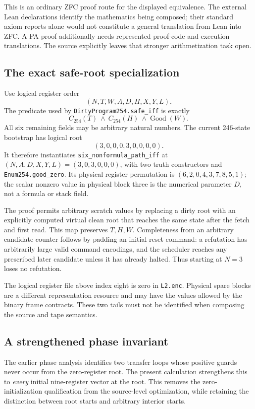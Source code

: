 This is an ordinary ZFC proof route for the displayed equivalence.  The
external Lean declarations identify the mathematics being composed; their
standard axiom reports alone would not constitute a general translation
from Lean into ZFC.  A PA proof additionally needs represented proof-code
and execution translations.  The source explicitly leaves that stronger
arithmetization task open.

\subsection{The exact safe-root specialization}

Use logical register order
\[
 (N,T,W,A,D,H,X,Y,L).
\]
The predicate used by \texttt{DirtyProgram254.safe\_iff} is exactly
\[
 C_{254}(T)\ \wedge\ C_{254}(H)\ \wedge\operatorname{Good}(W).
\]
All six remaining fields may be arbitrary natural numbers.  The current
246-state bootstrap has logical root
\[
 (3,0,0,0,3,0,0,0,0).
\]
It therefore instantiates
\texttt{six\_nonformula\_path\_iff} at
$(N,A,D,X,Y,L)=(3,0,3,0,0,0)$, with two truth constructors and
\texttt{Enum254.good\_zero}.  Its physical register permutation is
$(6,2,0,4,3,7,8,5,1)$; the scalar nonzero value in physical block three
is the numerical parameter $D$, not a formula or stack field.

The proof permits arbitrary scratch values by replacing a dirty root with
an explicitly computed virtual clean root that reaches the same state
after the fetch and first read.  This map preserves $T,H,W$.  Completeness
from an arbitrary candidate counter follows by padding an initial reset
command: a refutation has arbitrarily large valid command encodings, and
the scheduler reaches any prescribed later candidate unless it has
already halted.  Thus starting at $N=3$ loses no refutation.

The logical register file above index eight is zero in \texttt{L2.enc}.
Physical spare blocks are a different representation resource and may
have the values allowed by the binary frame contracts.  These two tails
must not be identified when composing the source and tape semantics.

\subsection{A strengthened phase invariant}

The earlier phase analysis identifies two transfer loops whose positive
guards never occur from the zero-register root.  The present calculation
strengthens this to \emph{every} initial nine-register vector at the root.
This removes the zero-initialization qualification from the source-level
optimization, while retaining the distinction between root starts and
arbitrary interior starts.

